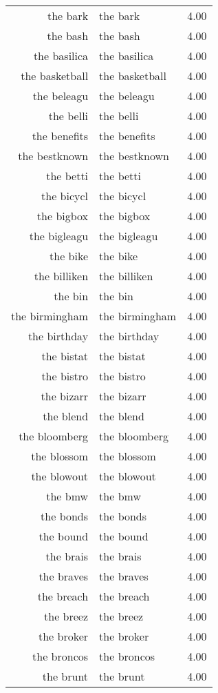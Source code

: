 \begin{table}[ht]
\begin{tabular}{rlr}
  the bark & the bark & 4.00 \\ 
  the bash & the bash & 4.00 \\ 
  the basilica & the basilica & 4.00 \\ 
  the basketball & the basketball & 4.00 \\ 
  the beleagu & the beleagu & 4.00 \\ 
  the belli & the belli & 4.00 \\ 
  the benefits & the benefits & 4.00 \\ 
  the bestknown & the bestknown & 4.00 \\ 
  the betti & the betti & 4.00 \\ 
  the bicycl & the bicycl & 4.00 \\ 
  the bigbox & the bigbox & 4.00 \\ 
  the bigleagu & the bigleagu & 4.00 \\ 
  the bike & the bike & 4.00 \\ 
  the billiken & the billiken & 4.00 \\ 
  the bin & the bin & 4.00 \\ 
  the birmingham & the birmingham & 4.00 \\ 
  the birthday & the birthday & 4.00 \\ 
  the bistat & the bistat & 4.00 \\ 
  the bistro & the bistro & 4.00 \\ 
  the bizarr & the bizarr & 4.00 \\ 
  the blend & the blend & 4.00 \\ 
  the bloomberg & the bloomberg & 4.00 \\ 
  the blossom & the blossom & 4.00 \\ 
  the blowout & the blowout & 4.00 \\ 
  the bmw & the bmw & 4.00 \\ 
  the bonds & the bonds & 4.00 \\ 
  the bound & the bound & 4.00 \\ 
  the brais & the brais & 4.00 \\ 
  the braves & the braves & 4.00 \\ 
  the breach & the breach & 4.00 \\ 
  the breez & the breez & 4.00 \\ 
  the broker & the broker & 4.00 \\ 
  the broncos & the broncos & 4.00 \\ 
  the brunt & the brunt & 4.00 \\ 

\end{tabular}
\end{table}
